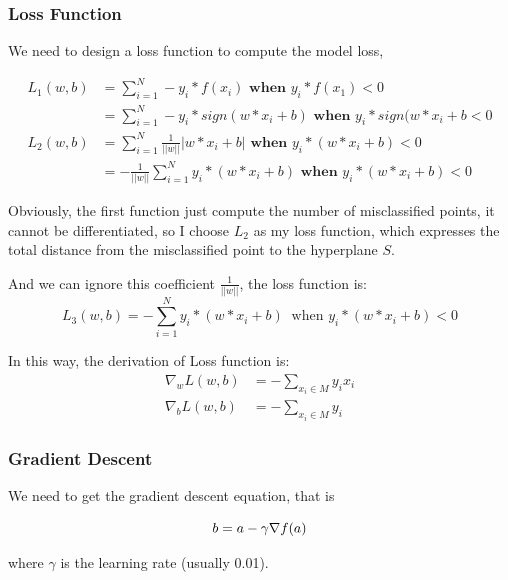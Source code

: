 \documentclass{article}
\begin{document}
\subsubsection{Loss Function}

We need to design a loss function to compute the model loss, 



\begin{align*}
    L_{1}(w,b) &= \sum_{i=1}^{N}-y_{i}*f(x_{i}) \textbf{ when } y_{i}*f(x_{1})<0 \\
               &= \sum_{i=1}^{N}-y_{i}*sign(w*x_{i}+b) \textbf{ when } y_{i}*sign(w*x_{i}+b <0\\
    L_{2}(w,b) &= \sum_{i=1}^{N}\frac{1}{||w||}|w*x_{i}+b| \textbf{ when } y_{i}*(w*x_{i}+b)<0\\
               &= -\frac{1}{||w||}\sum_{i=1}^{N}y_{i}*(w*x_{i}+b) \textbf{ when } y_{i}*(w*x_{i}+b)<0
\end{align*}

Obviously, the first function just compute the number of misclassified points, it cannot be differentiated, so I choose $L_2$ as my loss function, which expresses the total distance
from the misclassified point to the hyperplane $S$.

And we can ignore this coefficient $\frac{1}{||w||}$, the loss function is:
$$
L_{3}(w,b)=-\sum_{i=1}^{N}y_{i}*(w*x_{i}+b)\ \text{ when } y_{i}*(w*x_{i}+b)<0
$$

In this way, the derivation of Loss function is:
\begin{align*}
    \nabla_{w}L(w,b) &= -\sum_{x_{i} \in M}y_{i}x_{i}\\
    \nabla_{b}L(w,b) &= -\sum_{x_{i} \in M}y_{i}
\end{align*}

\subsubsection{Gradient Descent}

We need to get the gradient descent equation, that is

$$
b=a-\gamma\nabla f(a)\\
$$

where $\gamma$ is the learning rate (usually 0.01).
\end{document}
